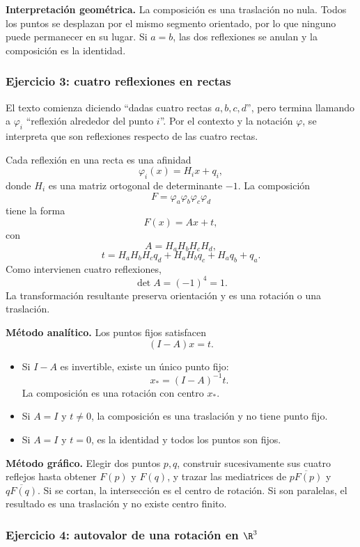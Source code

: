 \textbf{Interpretación geométrica.} La composición es una traslación no nula. Todos los puntos
se desplazan por el mismo segmento orientado, por lo que ninguno puede permanecer en su lugar.
Si \(a=b\), las dos reflexiones se anulan y la composición es la identidad.

\subsubsection{Ejercicio 3: cuatro reflexiones en rectas}

\begin{atencion}
El texto comienza diciendo ``dadas cuatro rectas \(a,b,c,d\)'', pero termina llamando a
\(\varphi_i\) ``reflexión alrededor del punto \(i\)''. Por el contexto y la notación
\(\varphi\), se interpreta que son reflexiones respecto de las cuatro rectas.
\end{atencion}

Cada reflexión en una recta es una afinidad
\[
  \varphi_i(x)=H_ix+q_i,
\]
donde \(H_i\) es una matriz ortogonal de determinante \(-1\). La composición
\[
  F=\varphi_a\varphi_b\varphi_c\varphi_d
\]
tiene la forma
\[
  F(x)=Ax+t,
\]
con
\[
  A=H_aH_bH_cH_d,
\]
\[
  t=H_aH_bH_cq_d+H_aH_bq_c+H_aq_b+q_a.
\]
Como intervienen cuatro reflexiones,
\[
  \det A=(-1)^4=1.
\]
La transformación resultante preserva orientación y es una rotación o una traslación.

\textbf{Método analítico.} Los puntos fijos satisfacen
\[
  (I-A)x=t.
\]
\begin{itemize}
  \item Si \(I-A\) es invertible, existe un único punto fijo:
  \[
    \boxed{x_\ast=(I-A)^{-1}t}.
  \]
  La composición es una rotación con centro \(x_\ast\).
  \item Si \(A=I\) y \(t\neq0\), la composición es una traslación y no tiene punto fijo.
  \item Si \(A=I\) y \(t=0\), es la identidad y todos los puntos son fijos.
\end{itemize}

\textbf{Método gráfico.} Elegir dos puntos \(p,q\), construir sucesivamente sus cuatro
reflejos hasta obtener \(F(p)\) y \(F(q)\), y trazar las mediatrices de
\(\overline{pF(p)}\) y \(\overline{qF(q)}\). Si se cortan, la intersección es el centro de
rotación. Si son paralelas, el resultado es una traslación y no existe centro finito.

\subsubsection{Ejercicio 4: autovalor de una rotación en \(\R^3\)}

